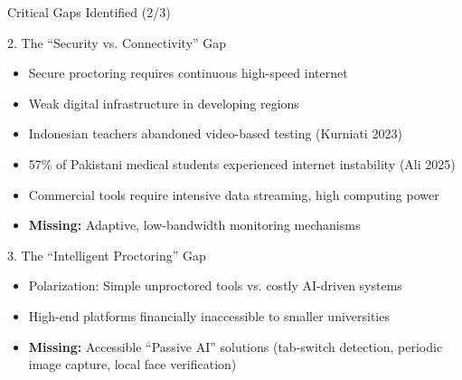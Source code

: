 \begin{frame}{Critical Gaps Identified (2/3)}
    \begin{alertblock}{2. The ``Security vs. Connectivity'' Gap}
        \begin{itemize}
            \item Secure proctoring requires continuous high-speed internet
            \item Weak digital infrastructure in developing regions
            \item Indonesian teachers abandoned video-based testing (Kurniati 2023)
            \item 57\% of Pakistani medical students experienced internet instability (Ali 2025)
            \item Commercial tools require intensive data streaming, high computing power
            \item \textbf{Missing:} Adaptive, low-bandwidth monitoring mechanisms
        \end{itemize}
    \end{alertblock}
    
    \begin{alertblock}{3. The ``Intelligent Proctoring'' Gap}
        \begin{itemize}
            \item Polarization: Simple unproctored tools vs. costly AI-driven systems
            \item High-end platforms financially inaccessible to smaller universities
            \item \textbf{Missing:} Accessible ``Passive AI'' solutions (tab-switch detection, periodic image capture, local face verification)
        \end{itemize}
    \end{alertblock}
\end{frame}

